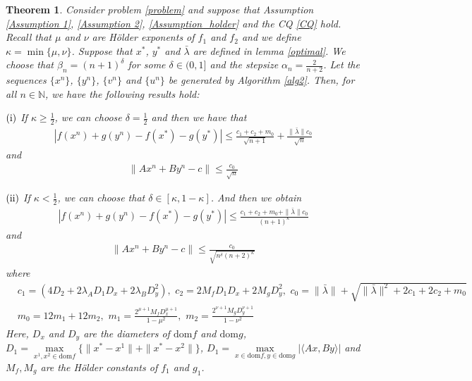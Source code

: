 \documentclass{article}
\numberwithin{equation}{section}
\newtheorem{theorem}{Theorem}[section]
\begin{document}
\begin{theorem} \label{Theorem_of_convergence_Holder}
    Consider problem \eqref{problem} and suppose that Assumption \ref{Assumption 1}, \ref{Assumption 2}, \ref{Assumption_holder} and the 
    CQ \eqref{CQ} hold. Recall that $\mu$ and $\nu$ are H\"older exponents of $f_1$ and $f_2$ and we define 
    $\kappa = \min\{\mu,\nu\}$. 
    Suppose that $x^*$, $y^*$ and $\bar{\lambda}$ are defined in lemma \ref{optimal}. 
    We choose that $\beta_n = (n+1)^{\delta}$ for some $\delta\in (0,1]$ and the stepsize $\alpha_n = \frac{2}{n+2}$.  
    Let the sequences $\{x^n\}$, $\{y^n\}$, $\{v^n\}$ and $\{u^n\}$ be generated by 
    Algorithm \ref{alg2}.  
    Then, for all $n\in \mathbb{N}$, we have the following results hold:
    
    $\mathrm{(\romannumeral1)}$ If $\kappa \geq \frac{1}{2}$, we can choose $\delta =\frac{1}{2}$
    and then we have that 
    \begin{align}
        \left|f(x^{n}) + g(y^{n})  - f(x^*) -g(y^*) \right| \leq \frac{c_1+ c_2+ m_0}{\sqrt{n+1}} 
        +\frac{\|\bar{\lambda} \rVert c_0}{\sqrt{n}} \nonumber 
    \end{align}
    and 
    \begin{align}
        \| Ax^n + By^n -c\rVert \leq \frac{c_0}{\sqrt{n}}  \nonumber
    \end{align}

    $\mathrm{(\romannumeral2)}$ If $\kappa < \frac{1}{2}$, we can choose that $\delta \in[\kappa, 1-\kappa]$.
    And then we obtain 
    \begin{align}
        \left| f(x^n) + g(y^n) -f(x^*) -g(y^*)\right| \leq \frac{c_1+ c_2 +m_0+ \|\bar{\lambda}\rVert c_0}{(n+1)^{\kappa}} \nonumber
    \end{align} 
    and
    \begin{align}
        \|Ax^n + By^n - c\rVert \leq \frac{c_0}{\sqrt{n^{\delta}(n+2)^{\kappa}}} \nonumber
    \end{align}
    where
    \begin{align}
        &c_1= (4D_2+2\lambda_{A} D_1D_x+ 2\lambda_{B} D_y^2),\hspace{4pt} c_2=2M_fD_1D_x+2M_gD_y^2,\hspace{4pt}c_0 = \|\bar{\lambda}\rVert +\sqrt{\|\bar{\lambda}\rVert^2+2c_1+2c_2+m_0} \nonumber \\
        &m_0 = 12m_1 + 12m_2,\hspace{4pt} m_1 =\frac{2^{\mu+1}M_fD_x^{\mu+1}}{1-\mu^2},\hspace{4pt} m_2= \frac{2^{\nu+1}M_gD_y^{\nu+1}}{1-\nu^2} \nonumber
    \end{align} 
    Here, $D_x$ and $D_y$ are the diameters of $\mathrm{dom}f$ and $\mathrm{dom}g$, 
    $D_1 = \max\limits_{x^1,x^2\in\mathrm{dom}f}\{\|x^*-x^1\rVert+\|x^*-x^2\rVert\}$, 
    $D_1 = \max\limits_{x\in\mathrm{dom}f,y\in\mathrm{dom}g}\left| \langle Ax,By \rangle \right|$ and $M_f, M_g$ 
    are the H\"older constants of $f_1$ and $g_1$.  
\end{theorem}
\end{document}
